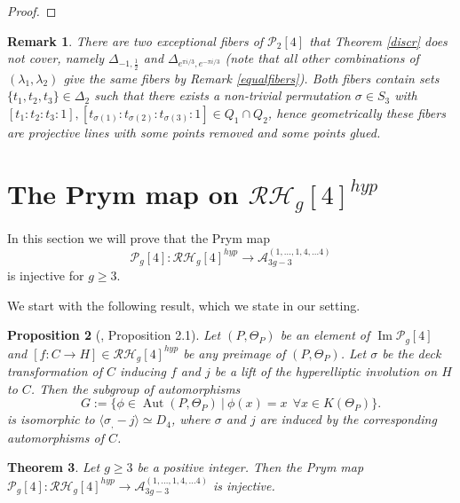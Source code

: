 \documentclass{article}
\newtheorem{thm}{Theorem}[section]
\newtheorem{prop}[thm]{Proposition}
\newtheorem{rem}[thm]{Remark}
\numberwithin{equation}{section}
\DeclareMathOperator{\Aut}{Aut}
\DeclareMathOperator{\Image}{Im}
\begin{document}
\begin{proof}
\end{proof}

\begin{rem}
    There are two exceptional fibers of $\mathcal{P}_2[4]$ that Theorem \ref{discr} does not cover, namely $\Delta_{-1, \frac{1}{2}}$ and $\Delta_{e^{\pi i /3}, e^{-\pi i /3}}$ (note that all other combinations of $(\lambda_1, \lambda_2)$ give the same fibers by Remark \ref{equalfibers}). Both fibers contain sets $\{t_1,t_2,t_3\} \in \Delta_2$ such that there exists a non-trivial permutation $\sigma \in S_3$ with $[t_1:t_2:t_3:1], [t_{\sigma(1)}: t_{\sigma(2)}: t_{\sigma(3)}:1] \in Q_1 \cap Q_2$, hence geometrically these fibers are projective lines with some points removed and some points glued. 
\end{rem}

\section{The Prym map on $\mathcal{RH}_g[4]^{hyp}$}
\label{sec5}

In this section we will prove that the Prym map $$\mathcal{P}_g[4]: \mathcal{RH}_g[4]^{hyp} \to \mathcal{A}_{3g-3}^{(1,\ldots,1,4,\ldots4)}$$ is injective for $g \geq 3$.

We start with the following result, which we state in our setting.

\begin{prop}[\cite{borówka2025prymmapscycliccoverings}, Proposition 2.1]
\label{group}
    Let $(P, \Theta_P)$ be an element of $\Image\mathcal{P}_g[4]$ and $[f: C \to H] \in \mathcal{RH}_g[4]^{hyp}$ be any preimage of $(P, \Theta_P)$. Let $\sigma$ be the deck transformation of $C$ inducing $f$ and $j$ be a lift of the hyperelliptic involution on $H$ to $C$.
    Then the subgroup of automorphisms $$G := \{ \phi \in \Aut(P,\Theta_P) \: | \: \phi(x) = x \:\: \forall x \in K(\Theta_P)\}.$$
    is isomorphic to $\langle \sigma_, -j \rangle \simeq D_4$, where $\sigma$ and $j$ are induced by the corresponding automorphisms of $C$.
\end{prop}

\begin{thm}
\label{injective}
    Let $g \geq 3$ be a positive integer. Then the Prym map $\mathcal{P}_g[4]: \mathcal{RH}_g[4]^{hyp} \to\mathcal{A}_{3g-3}^{(1,\ldots,1,4,\ldots4)} $ is injective.
\end{thm}
\end{document}
